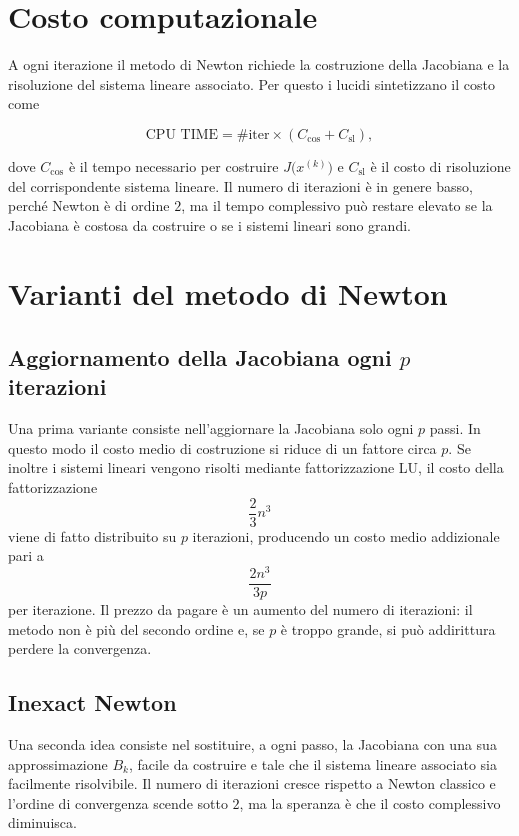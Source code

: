 \documentclass[11pt,a4paper]{report}
\begin{document}
\section{Costo computazionale}
A ogni iterazione il metodo di Newton richiede la costruzione della Jacobiana e la risoluzione del sistema lineare associato. Per questo i lucidi sintetizzano il costo come
\begin{formulaBox}
\[
 \text{CPU TIME}=\#\mathrm{iter}\times (C_{\mathrm{cos}}+C_{\mathrm{sl}}),
\]
\end{formulaBox}
dove $C_{\mathrm{cos}}$ \`e il tempo necessario per costruire $J\bigl(x^{(k)}\bigr)$ e $C_{\mathrm{sl}}$ \`e il costo di risoluzione del corrispondente sistema lineare.
Il numero di iterazioni \`e in genere basso, perch\'e Newton \`e di ordine $2$, ma il tempo complessivo pu\`o restare elevato se la Jacobiana \`e costosa da costruire o se i sistemi lineari sono grandi.

\section{Varianti del metodo di Newton}

\subsection{Aggiornamento della Jacobiana ogni $p$ iterazioni}
Una prima variante consiste nell'aggiornare la Jacobiana solo ogni $p$ passi.
In questo modo il costo medio di costruzione si riduce di un fattore circa $p$.
Se inoltre i sistemi lineari vengono risolti mediante fattorizzazione LU, il costo della fattorizzazione
\[
 \frac23 n^3
\]
viene di fatto distribuito su $p$ iterazioni, producendo un costo medio addizionale pari a
\[
 \frac{2n^3}{3p}
\]
per iterazione.
Il prezzo da pagare \`e un aumento del numero di iterazioni: il metodo non \`e pi\`u del secondo ordine e, se $p$ \`e troppo grande, si pu\`o addirittura perdere la convergenza.

\subsection{Inexact Newton}
Una seconda idea consiste nel sostituire, a ogni passo, la Jacobiana con una sua approssimazione $B_k$, facile da costruire e tale che il sistema lineare associato sia facilmente risolvibile.
Il numero di iterazioni cresce rispetto a Newton classico e l'ordine di convergenza scende sotto $2$, ma la speranza \`e che il costo complessivo diminuisca.
\end{document}
